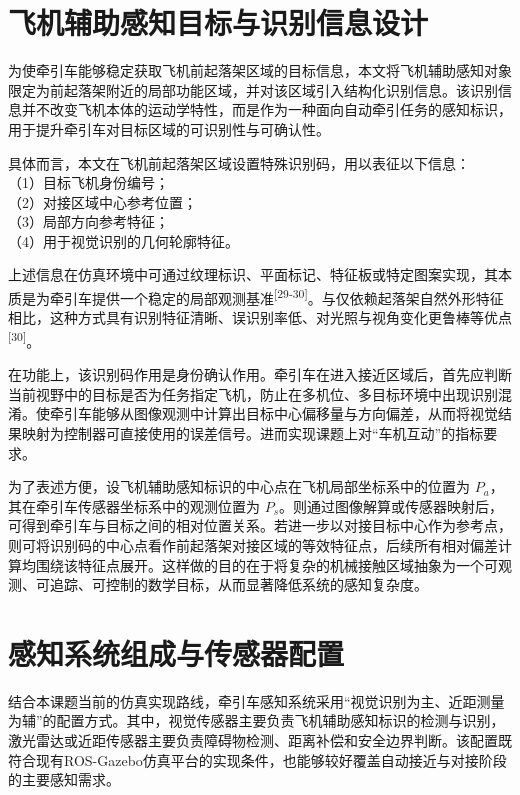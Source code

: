 \section{飞机辅助感知目标与识别信息设计}

为使牵引车能够稳定获取飞机前起落架区域的目标信息，本文将飞机辅助感知对象限定为前起落架附近的局部功能区域，并对该区域引入结构化识别信息。该识别信息并不改变飞机本体的运动学特性，而是作为一种面向自动牵引任务的感知标识，用于提升牵引车对目标区域的可识别性与可确认性。

具体而言，本文在飞机前起落架区域设置特殊识别码，用以表征以下信息：\\
（1）目标飞机身份编号；\\
（2）对接区域中心参考位置；\\
（3）局部方向参考特征；\\
（4）用于视觉识别的几何轮廓特征。

上述信息在仿真环境中可通过纹理标识、平面标记、特征板或特定图案实现，其本质是为牵引车提供一个稳定的局部观测基准\textsuperscript{[29-30]}。与仅依赖起落架自然外形特征相比，这种方式具有识别特征清晰、误识别率低、对光照与视角变化更鲁棒等优点\textsuperscript{[30]}。

在功能上，该识别码作用是身份确认作用。牵引车在进入接近区域后，首先应判断当前视野中的目标是否为任务指定飞机，防止在多机位、多目标环境中出现识别混淆。使牵引车能够从图像观测中计算出目标中心偏移量与方向偏差，从而将视觉结果映射为控制器可直接使用的误差信号。进而实现课题上对“车机互动”的指标要求。

为了表述方便，设飞机辅助感知标识的中心点在飞机局部坐标系中的位置为
\(P_{a}\)，其在牵引车传感器坐标系中的观测位置为
\(P_{s}\)。则通过图像解算或传感器映射后，可得到牵引车与目标之间的相对位置关系。若进一步以对接目标中心作为参考点，则可将识别码的中心点看作前起落架对接区域的等效特征点，后续所有相对偏差计算均围绕该特征点展开。这样做的目的在于将复杂的机械接触区域抽象为一个可观测、可追踪、可控制的数学目标，从而显著降低系统的感知复杂度。

\section{感知系统组成与传感器配置}

结合本课题当前的仿真实现路线，牵引车感知系统采用“视觉识别为主、近距测量为辅”的配置方式。其中，视觉传感器主要负责飞机辅助感知标识的检测与识别，激光雷达或近距传感器主要负责障碍物检测、距离补偿和安全边界判断。该配置既符合现有ROS-Gazebo仿真平台的实现条件，也能够较好覆盖自动接近与对接阶段的主要感知需求。

